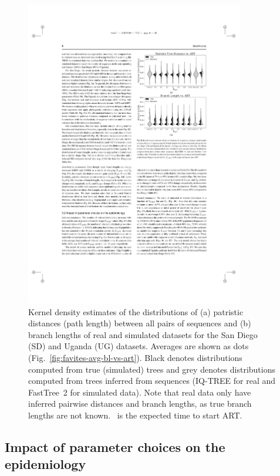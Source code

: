 \begin{figure}[ht] %
\centering
\includegraphics[width=0.85\textwidth]{figs/favites-real-vs-sim}
\caption[Real vs. Simulated Data]
{Kernel density estimates of the distributions of (a) patristic distances (path length) between all pairs of sequences and (b) branch lengths of real and simulated datasets for the San Diego (SD) and Uganda (UG) datasets. Averages are shown as dots (Fig.~\ref{fig:favites-avg-bl-vs-art}). Black denotes distributions computed from true (simulated) trees and grey denotes distributions computed from trees inferred from sequences (IQ-TREE for real and FastTree~2 for simulated data).  Note that real data only have inferred pairwise distances and branch lengths, as true branch lengths are not known. \EART\ is the expected time to start ART.}
\label{fig:favites-real-vs-sim}
\end{figure}

\subsection{Impact of parameter choices on the epidemiology}

